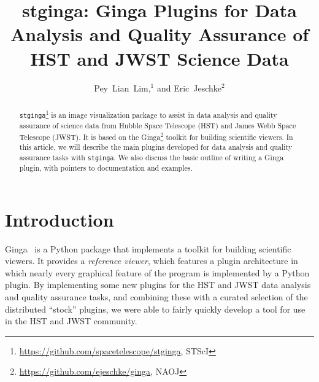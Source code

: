\documentclass[11pt,twoside]{article}
\begin{document}
\title{stginga: Ginga Plugins for Data Analysis and Quality Assurance of HST and JWST Science Data}

\author{Pey~Lian~Lim,$^1$ and Eric~Jeschke$^2$
  }




\begin{abstract}

{\tt stginga}\footnote{\url{https://github.com/spacetelescope/stginga}, STScI}
is an image visualization package to assist
in data analysis and quality assurance of science data from Hubble Space
Telescope (HST) and James Webb Space Telescope (JWST).  It is based on the
Ginga\footnote{\url{https://github.com/ejeschke/ginga}, NAOJ} toolkit for
building scientific viewers.
In this article, we will describe the main plugins developed for data
analysis and quality assurance tasks with {\tt stginga}.  We also discuss the
basic outline of writing a Ginga plugin, with pointers to documentation
and examples.

\end{abstract}

\section{Introduction}

Ginga~\citep{Jeschke15A} is a Python package that
implements a toolkit for building scientific viewers.  It provides
a \emph{reference viewer}, which features
a plugin architecture in which nearly every graphical feature of the
program is implemented by a Python plugin.
By implementing some new plugins for the HST and JWST data analysis and
quality assurance tasks, and combining these with a curated selection of
the distributed ``stock'' plugins, we were able to fairly quickly
develop a tool for use in the HST and JWST community.
\end{document}
